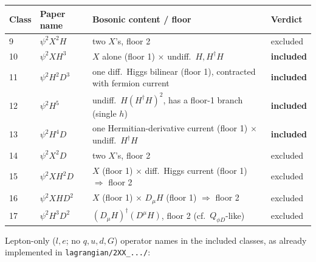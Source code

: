 \documentclass[11pt,a4paper]{article}
\begin{document}
\begin{center}
\begin{tabular}{@{}llll@{}}
\toprule
Class & Paper name & Bosonic content / floor & Verdict \\
\midrule
9  & $\psi^2X^2H$   & two $X$'s, floor 2 & excluded \\
10 & $\psi^2XH^3$    & $X$ alone (floor 1) $\times$ undiff.\ $H,H^\dagger H$ & \textbf{included} \\
11 & $\psi^2H^2D^3$  & one diff.\ Higgs bilinear (floor 1), contracted with fermion current & \textbf{included} \\
12 & $\psi^2H^5$     & undiff.\ $H(H^\dagger H)^2$, has a floor-1 branch (single $h$) & \textbf{included} \\
13 & $\psi^2H^4D$    & one Hermitian-derivative current (floor 1) $\times$ undiff.\ $H^\dagger H$ & \textbf{included} \\
14 & $\psi^2X^2D$    & two $X$'s, floor 2 & excluded \\
15 & $\psi^2XH^2D$   & $X$ (floor 1) $\times$ diff.\ Higgs current (floor 1) $\Rightarrow$ floor 2 & excluded \\
16 & $\psi^2XHD^2$   & $X$ (floor 1) $\times$ $D_\mu H$ (floor 1) $\Rightarrow$ floor 2 & excluded \\
17 & $\psi^2H^3D^2$  & $(D_\mu H)^\dagger(D^\mu H)$, floor 2 (cf.\ $Q_{\phi D}$-like) & excluded \\
\bottomrule
\end{tabular}
\end{center}

Lepton-only ($l,e$; no $q,u,d,G$) operator names in the included classes,
as already implemented in \texttt{lagrangian/2XX\_.../}:
\end{document}
